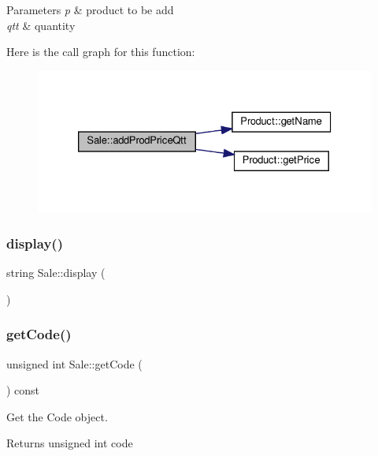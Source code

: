 \begin{DoxyParams}{Parameters}
{\em p} & product to be add \\
\hline
{\em qtt} & quantity \\
\hline
\end{DoxyParams}
Here is the call graph for this function\+:\nopagebreak
\begin{figure}[H]
\begin{center}
\leavevmode
\includegraphics[width=326pt]{classSale_ad582ae56bc2aa780b428e31de213a192_cgraph}
\end{center}
\end{figure}
\mbox{\label{classSale_af237ba4edbb4747b5d325fa7d60de179}} 
\subsubsection{\texorpdfstring{display()}{display()}}
{\footnotesize\ttfamily string Sale\+::display (\begin{DoxyParamCaption}{ }\end{DoxyParamCaption})}

\mbox{\label{classSale_a0f4f6f985ba28b31fc56adfac37bc952}} 
\subsubsection{\texorpdfstring{get\+Code()}{getCode()}}
{\footnotesize\ttfamily unsigned int Sale\+::get\+Code (\begin{DoxyParamCaption}{ }\end{DoxyParamCaption}) const}



Get the Code object. 

\begin{DoxyReturn}{Returns}
unsigned int code 
\end{DoxyReturn}
\mbox{\label{classSale_a7dbd53790d4cbd1d04163f3ace444122}} 

